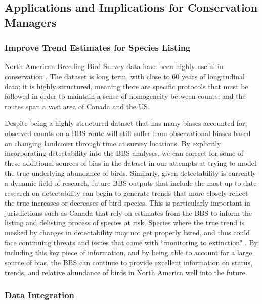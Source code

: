 \documentclass[12pt]{article}
\begin{document}
\subsection{Applications and Implications for Conservation Managers}
\subsubsection{Improve Trend Estimates for Species Listing}

\par North American Breeding Bird Survey data have been highly useful in conservation \citep{hudson_role_2017}.
The dataset is long term, with close to 60 years of longitudinal data; it is highly structured, meaning there are specific protocols that must be followed in order to maintain a sense of homogeneity between counts; and the routes span a vast area of Canada and the US.

\par Despite being a highly-structured dataset that has many biases accounted for, observed counts on a BBS route will still suffer from observational biases based on changing landcover through time at survey locations.
By explicitly incorporating detectability into the BBS analyses, we can correct for some of these additional sources of bias in the dataset in our attempts at trying to model the true underlying abundance of birds.
Similarly, given detectability is currently a dynamic field of research, future BBS outputs that include the most up-to-date research on detectability can begin to generate trends that more closely reflect the true increases or decreases of bird species.
This is particularly important in jurisdictions such as Canada that rely on estimates from the BBS to inform the listing and delisting process of species at risk.
Species where the true trend is masked by changes in detectability may not get properly listed, and thus could face continuing threats and issues that come with ``monitoring to extinction" \citep{martin_acting_2012, lindenmayer_counting_2013}.
By including this key piece of information, and by being able to account for a large source of bias, the BBS can continue to provide excellent information on status, trends, and relative abundance of birds in North America well into the future.

\subsubsection{Data Integration}
\end{document}
